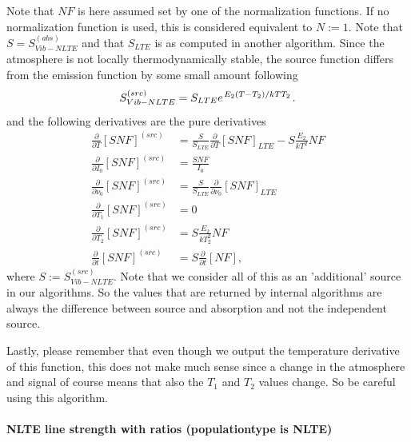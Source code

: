 Note that $NF$ is here assumed set by one of the normalization functions.  If no normalization function is used, 
this is considered equivalent to $N:=1$. Note that $S=S^{(abs)}_{Vib-NLTE}$ and that $S_{LTE}$ is as computed in 
another algorithm.  Since the atmosphere is not locally thermodynamically stable, the source function differs 
from the emission function by some small amount following
\begin{equation}
 S^{(src)}_{Vib-NLTE} = S_{LTE} e^{\left.{E_2 (T - T_2)}\middle/{kTT_2}\right.}.
\end{equation}
and the following derivatives are the pure derivatives
\begin{equation}
 \begin{array}{ll}
  \frac{\partial}{\partial T} \left[SNF\right]^{(src)} &= \frac{S}{S_{LTE}}\frac{\partial}{\partial T} \left[SNF\right]_{LTE} - S \frac{E_2}{kT^2}NF \\[5pt]
  \frac{\partial}{\partial I_0} \left[SNF\right]^{(src)} &= \frac{SNF}{I_0} \\[5pt]
  \frac{\partial}{\partial \nu_0} \left[SNF\right]^{(src)} &= \frac{S}{S_{LTE}} \frac{\partial}{\partial \nu_0} \left[SNF\right]_{LTE} \\[5pt]
  \frac{\partial}{\partial T_1} \left[SNF\right]^{(src)} &= 0 \\[5pt]
  \frac{\partial}{\partial T_2} \left[SNF\right]^{(src)} &= S \frac{E_2}{kT^2_2} NF \\[5pt]
  \frac{\partial}{\partial t} \left[SNF\right]^{(src)} &= S\frac{\partial}{\partial t} \left[NF\right],
 \end{array}
\end{equation}
where $S:=S^{(src)}_{Vib-NLTE}$.
Note that we consider all of this as an 'additional' source in our algorithms.  So 
the values that are returned by internal algorithms are always the difference between
source and absorption and not the independent source.

Lastly, please remember that even though we output the temperature derivative of this
function, this does not make much sense since a change in the atmosphere and signal of
course means that also the $T_1$ and $T_2$ values change.  So be careful using this algorithm.

\paragraph*{NLTE line strength with ratios (populationtype is NLTE)} \

